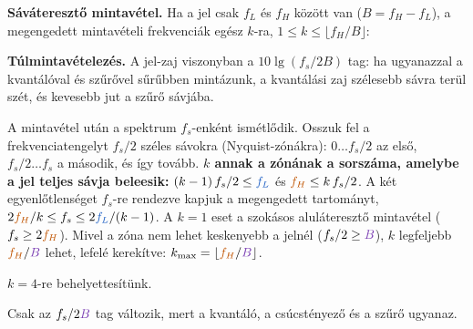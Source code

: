 \begin{elmelet}
\textbf{Sáváteresztő mintavétel.} Ha a jel csak $f_L$ és $f_H$ között van ($B=f_H-f_L$), a megengedett mintavételi frekvenciák egész $k$-ra, $1\le k\le\lfloor f_H/B\rfloor$:
\begin{center}\end{center}


\textbf{Túlmintavételezés.} A jel-zaj viszonyban a $10\lg(f_s/2B)$ tag: ha ugyanazzal a kvantálóval és szűrővel sűrűbben mintázunk, a kvantálási zaj szélesebb sávra terül szét, és kevesebb jut a szűrő sávjába.
\end{elmelet}

A mintavétel után a spektrum $f_s$-enként ismétlődik. Osszuk fel a frekvenciatengelyt $f_s/2$ széles sávokra (Nyquist-zónákra): $0\ldots f_s/2$ az első, $f_s/2\ldots f_s$ a második, és így tovább. \textbf{$k$ annak a zónának a sorszáma, amelybe a jel teljes sávja beleesik:} $(k-1)\,f_s/2\le {\ca{f_L}}$ és ${\cb{f_H}}\le k\,f_s/2$. A két egyenlőtlenséget $f_s$-re rendezve kapjuk a megengedett tartományt, $2{\cb{f_H}}/k\le f_s\le2{\ca{f_L}}/(k-1)$. A $k=1$ eset a szokásos aluláteresztő mintavétel ($f_s\ge2{\cb{f_H}}$). Mivel a zóna nem lehet keskenyebb a jelnél ($f_s/2\ge {\cc{B}}$), $k$ legfeljebb ${\cb{f_H}}/{\cc{B}}$ lehet, lefelé kerekítve: $k_{\max}=\lfloor {\cb{f_H}}/{\cc{B}}\rfloor$.

$k=4$-re behelyettesítünk.

\begin{center}\end{center}

Csak az $f_s/2{\cc{B}}$ tag változik, mert a kvantáló, a csúcstényező és a szűrő ugyanaz.

\begin{center}\end{center}

